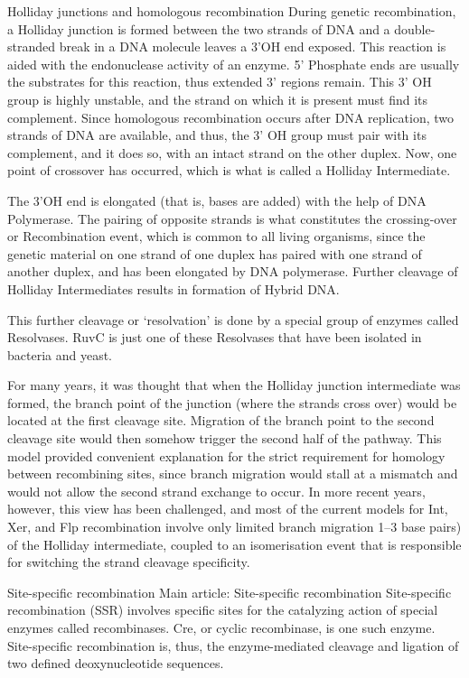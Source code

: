 Holliday junctions and homologous recombination
During genetic recombination, a Holliday junction is formed between the two strands of DNA and a double-stranded break in a DNA molecule leaves a 3'OH end exposed. This reaction is aided with the endonuclease activity of an enzyme. 5' Phosphate ends are usually the substrates for this reaction, thus extended 3' regions remain. This 3' OH group is highly unstable, and the strand on which it is present must find its complement. Since homologous recombination occurs after DNA replication, two strands of DNA are available, and thus, the 3' OH group must pair with its complement, and it does so, with an intact strand on the other duplex. Now, one point of crossover has occurred, which is what is called a Holliday Intermediate.

The 3'OH end is elongated (that is, bases are added) with the help of DNA Polymerase. The pairing of opposite strands is what constitutes the crossing-over or Recombination event, which is common to all living organisms, since the genetic material on one strand of one duplex has paired with one strand of another duplex, and has been elongated by DNA polymerase. Further cleavage of Holliday Intermediates results in formation of Hybrid DNA.

This further cleavage or `resolvation' is done by a special group of enzymes called Resolvases. RuvC is just one of these Resolvases that have been isolated in bacteria and yeast.

For many years, it was thought that when the Holliday junction intermediate was formed, the branch point of the junction (where the strands cross over) would be located at the first cleavage site. Migration of the branch point to the second cleavage site would then somehow trigger the second half of the pathway. This model provided convenient explanation for the strict requirement for homology between recombining sites, since branch migration would stall at a mismatch and would not allow the second strand exchange to occur. In more recent years, however, this view has been challenged, and most of the current models for Int, Xer, and Flp recombination involve only limited branch migration 1--3 base pairs) of the Holliday intermediate, coupled to an isomerisation event that is responsible for switching the strand cleavage specificity.

Site-specific recombination
Main article: Site-specific recombination
Site-specific recombination (SSR) involves specific sites for the catalyzing action of special enzymes called recombinases. Cre, or cyclic recombinase, is one such enzyme. Site-specific recombination is, thus, the enzyme-mediated cleavage and ligation of two defined deoxynucleotide sequences.


